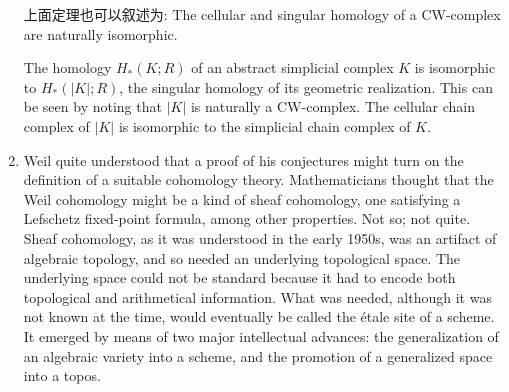 \documentclass{ctexart}
\begin{document}
\begin{enumerate}
上面定理也可以叙述为: The cellular and singular homology of a CW-complex are naturally isomorphic.

The homology $H_\ast(K;R)$ of an abstract simplicial complex $K$ is isomorphic to $H_\ast(\left|K\right|;R)$, the singular homology of its geometric realization. This can be seen by noting that $\left|K\right|$ is naturally a CW-complex. The cellular chain complex of $\left|K\right|$ is isomorphic to the simplicial chain complex of $K$.

\item \cite{tohoku}Weil quite understood that a proof of his conjectures might turn on the definition of a suitable cohomology theory. Mathematicians thought that the Weil cohomology might be a kind of sheaf cohomology, one satisfying a Lefschetz fixed-point formula, among other properties. Not so; not quite. Sheaf cohomology, as it was understood in the early 1950s, was an artifact of algebraic topology, and so needed an underlying topological space. The underlying space could not be standard because it had to encode both topological and arithmetical information. What was needed, although it was not known at the time, would eventually be called the étale site of a scheme. It emerged by means of two major intellectual advances: the generalization of an algebraic variety into a scheme, and the promotion of a generalized space into a topos.
\end{enumerate}



\newpage
\printbibliography
\end{document}
